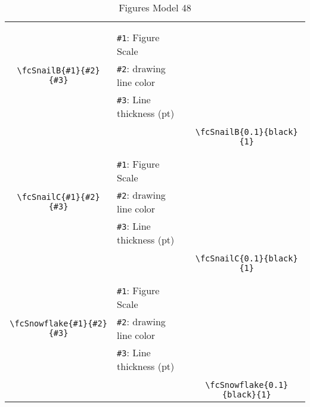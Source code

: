 \documentclass[x11names]{article}
\begin{document}
\begin{table}[H]
\begin{tabular}{|c|l|c|}
	&&\multirow{5}{*}{\fcSnailB{0.1}{black}{1}}\\	&&\\	&\verb|#1|: Figure Scale &\\	\verb|\fcSnailB{#1}{#2}{#3}|&	\verb|#2|: drawing line color &\\	&\verb|#3|: Line thickness (pt) &\\ &&\\&&	\verb|\fcSnailB{0.1}{black}{1}|\\\hline 	
	&&\multirow{5}{*}{\fcSnailC{0.1}{black}{1}}\\	&&\\	&\verb|#1|: Figure Scale &\\	\verb|\fcSnailC{#1}{#2}{#3}|&	\verb|#2|: drawing line color &\\	&\verb|#3|: Line thickness (pt) &\\ &&\\&&	\verb|\fcSnailC{0.1}{black}{1}|\\\hline 	
	&&\multirow{5}{*}{\fcSnowflake{0.1}{black}{1}}\\	&&\\	&\verb|#1|: Figure Scale &\\	\verb|\fcSnowflake{#1}{#2}{#3}|&	\verb|#2|: drawing line color &\\	&\verb|#3|: Line thickness (pt) &\\ &&\\&&	\verb|\fcSnowflake{0.1}{black}{1}|\\\hline 	\hline\end{tabular}\caption{Figures Model 48}\label{tab48}\end{table}
\end{document}

